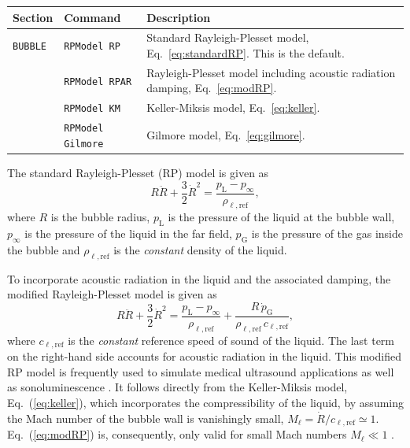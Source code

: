 \noindent
\begin{tabular}{p{} p{} p{}}
    \textbf{Section} &\textbf{Command} & \textbf{Description} 
\vspace{1mm} \\ \hline
{\tt BUBBLE} & {\tt RPModel RP} & Standard Rayleigh-Plesset model, Eq.~\eqref{eq:standardRP}. This is the default.\\ 
 & {\tt RPModel RPAR} & Rayleigh-Plesset model including acoustic radiation damping, Eq.~\eqref{eq:modRP}.\\ 
 & {\tt RPModel KM} & Keller-Miksis model, Eq.~\eqref{eq:keller}.\\ 
 & {\tt RPModel Gilmore} & Gilmore model, Eq.~\eqref{eq:gilmore}.\\ 
 \hline
\end{tabular} \vspace{1em}

\noindent The standard Rayleigh-Plesset (RP) model is given as \citep{Lauterborn2010}
\begin{equation}
R \ddot{R} + \frac{3}{2} \dot{R}^2 = \frac{p_\text{L} - p_\infty}{\rho_{\ell,\mathrm{ref}}},
\label{eq:standardRP}
\end{equation}
where $R$ is the bubble radius, $p_\text{L}$ is the pressure of the liquid at the bubble wall, $p_\infty$ is the pressure of the liquid in the far field, $p_\text{G}$ is the pressure of the gas inside the bubble and $\rho_{\ell,\mathrm{ref}}$ is the {\it constant} density of the liquid.

To incorporate acoustic radiation in the liquid and the associated damping, the modified Rayleigh-Plesset model is given as \citep{Brenner2002}
\begin{equation}
R \ddot{R} + \frac{3}{2} \dot{R}^2 = \frac{p_\text{L} - p_\infty}{\rho_{\ell,\mathrm{ref}}} + \frac{R \, \dot{p}_\text{G}}{\rho_{\ell,\mathrm{ref}} \, c_{\ell,\mathrm{ref}}} ,
\label{eq:modRP}
\end{equation}
where $c_{\ell,\mathrm{ref}}$ is the \textit{constant} reference speed of sound of the liquid. The last term on the right-hand side accounts for acoustic radiation in the liquid.
This modified RP model is frequently used to simulate medical ultrasound applications \citep{Versluis2020} as well as sonoluminescence \citep{Brenner2002}.
It follows directly from the Keller-Miksis model, Eq.~(\ref{eq:keller}), which incorporates the compressibility of the liquid, by assuming the Mach number of the bubble wall is vanishingly small, $M_\ell = \dot{R}/c_{\ell,\mathrm{ref}} \simeq 1$. Eq.~(\ref{eq:modRP}) is, consequently, only valid for small Mach numbers $M_\ell \ll 1$ \citep{Neppiras1980, Prosperetti1986}.

